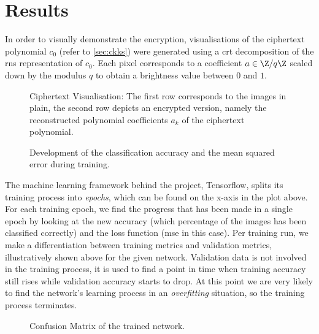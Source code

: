 \chapter{Results}
\label{chap:results}
In order to visually demonstrate the encryption, visualisations of the ciphertext polynomial $c_0$ (refer to \cref{sec:ckks}) were generated using a \gls{crt} decomposition of the \gls{rns} representation of $c_0$.
Each pixel corresponds to a coefficient $a \in \Z / q\Z$ scaled down by the modulus $q$ to obtain a brightness value between $0$ and $1$.

\begin{figure}[H]
  \centering
  \caption[Visualisation of the plain input images compared to their ciphertext]{Ciphertext Visualisation: The first row corresponds to the images in plain, the second row depicts an encrypted version, namely the reconstructed polynomial coefficients $a_k$ of the ciphertext polynomial.}
  \label{fig:ciphertext-visualisation}
\end{figure}

\begin{figure}[H]
  \centering
  \pgfplotsset{/pgfplots/group/.cd,vertical sep=1.6cm}
  \caption[Classification accuracy and loss development during training]{Development of the classification accuracy and the mean squared error during training.}
  \label{fig:training-history}
\end{figure}

The machine learning framework behind the project, Tensorflow, splits its training process into \textit{epochs}, which can be found on the x-axis in the plot above.
For each training epoch, we find the progress that has been made in a single epoch by looking at the new accuracy (which percentage of the images has been classified correctly) and the loss function (\gls{mse} in this case).
Per training run, we make a differentiation between training metrics and validation metrics, illustratively shown above for the given network.
Validation data is not involved in the training process, it is used to find a point in time when training accuracy still rises while validation accuracy starts to drop.
At this point we are very likely to find the network's learning process in an \textit{overfitting} situation, so the training process terminates.

\begin{figure}[H]
  \centering
  \caption[Confusion Matrix of the trained network]{Confusion Matrix of the trained network. }
  \label{fig:confusion-matrix}
\end{figure}

